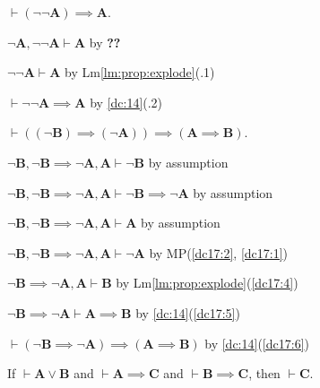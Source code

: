 \documentclass{amsart}%
\newcommand\metavariable[1]{\boldsymbol{#1}}
\begin{document}
\begin{dc}\label{dc:16}
$\vdash(\neg\neg\metavariable{A})\implies\metavariable{A}$.
\end{dc}

\begin{pf}
\item $\neg\metavariable{A},\neg\neg\metavariable{A}\vdash\metavariable{A}$
  by \textbf{??}
\item $\neg\neg\metavariable{A}\vdash\metavariable{A}$ by Lm\ref{lm:prop:explode}(.1)
\item $\vdash\neg\neg\metavariable{A}\implies\metavariable{A}$ by \ref{dc:14}(.2)
\end{pf}

\begin{dc}[Contrapositive]\label{dc:17}
$\vdash((\neg\metavariable{B})\implies(\neg\metavariable{A}))\implies(\metavariable{A}\implies\metavariable{B})$.
\end{dc}

\begin{pf}
\item\label{dc17:1} $\neg\metavariable{B},\neg\metavariable{B}\implies\neg\metavariable{A},\metavariable{A}\vdash\neg\metavariable{B}$
by assumption
\item\label{dc17:2} $\neg\metavariable{B},\neg\metavariable{B}\implies\neg\metavariable{A},\metavariable{A}\vdash\neg\metavariable{B}\implies\neg\metavariable{A}$
by assumption
\item\label{dc17:3} $\neg\metavariable{B},\neg\metavariable{B}\implies\neg\metavariable{A},\metavariable{A}\vdash\metavariable{A}$
by assumption
\item\label{dc17:4} $\neg\metavariable{B},\neg\metavariable{B}\implies\neg\metavariable{A},\metavariable{A}\vdash\neg\metavariable{A}$ by MP(\ref{dc17:2}, \ref{dc17:1})
\item\label{dc17:5} $\neg\metavariable{B}\implies\neg\metavariable{A},\metavariable{A}\vdash\metavariable{B}$ by Lm\ref{lm:prop:explode}(\ref{dc17:4})
\item\label{dc17:6} $\neg\metavariable{B}\implies\neg\metavariable{A}\vdash\metavariable{A}\implies\metavariable{B}$ by \ref{dc:14}(\ref{dc17:5})
\item\label{dc17:7} $\vdash(\neg\metavariable{B}\implies\neg\metavariable{A})\implies(\metavariable{A}\implies\metavariable{B})$ by \ref{dc:14}(\ref{dc17:6})
\end{pf}

\begin{dc}\label{dc:18}
If $\vdash\metavariable{A}\lor\metavariable{B}$
and $\vdash\metavariable{A}\implies\metavariable{C}$
and $\vdash\metavariable{B}\implies\metavariable{C}$,
then $\vdash\metavariable{C}$.
\end{dc}
\end{document}
